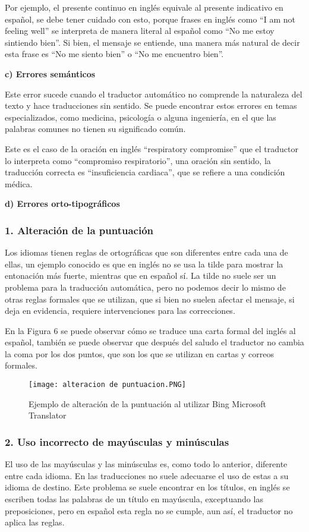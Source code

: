 \documentclass[conference]{IEEEtran}
\begin{document}
Por ejemplo, el presente continuo en inglés equivale al presente indicativo en español, se debe tener cuidado con esto, porque frases en inglés como “I am not feeling well” se interpreta de manera literal al español como “No me estoy sintiendo bien”. Si bien, el mensaje se entiende, una manera más natural de decir esta frase es “No me siento bien” o “No me encuentro bien”.

 \textbf{c) Errores semánticos}
 
 Este error sucede cuando el traductor automático no comprende la naturaleza del texto y hace traducciones sin sentido. Se puede encontrar estos errores en temas especializados, como medicina, psicología o alguna ingeniería, en el que las palabras comunes no tienen su significado común.
 
 Este es el caso de la oración en inglés “respiratory compromise” que el traductor lo interpreta como “compromiso respiratorio”, una oración sin sentido, la traducción correcta es “insuficiencia cardiaca”, que se refiere a una condición médica.
 
  \textbf{d) Errores orto-tipográficos}
  \subsubsection*{1. Alteración de la puntuación}

  Los idiomas tienen reglas de ortográficas que son diferentes entre cada una de ellas, un ejemplo conocido es que en inglés no se usa la tilde para mostrar la entonación más fuerte, mientras que en español sí. La tilde no suele ser un problema para la traducción automática, pero no podemos decir lo mismo de otras reglas formales que se utilizan, que si bien no suelen afectar el mensaje, si deja en evidencia, requiere intervenciones para las correcciones.
  
  En la Figura 6 se puede observar cómo se traduce una carta formal del inglés al español, también se puede observar que después del saludo el traductor no cambia la coma por los dos puntos, que son los que se utilizan en cartas y correos formales.

  \begin{figure}[htp]
        \centering
        \texttt{[image: alteracion de puntuacion.PNG]}
        \label{foto}
        \caption{Ejemplo de alteración de la puntuación al utilizar Bing Microsoft Translator}
    \end{figure}

\subsubsection*{2. Uso incorrecto de mayúsculas y minúsculas}
El uso de las mayúsculas y las minúsculas es, como todo lo anterior, diferente entre cada idioma. En las traducciones no suele adecuarse el uso de estas a su idioma de destino. Este problema se suele encontrar en los títulos, en inglés se escriben todas las palabras de un título en mayúscula, exceptuando las preposiciones, pero en español esta regla no se cumple, aun así, el traductor no aplica las reglas.
\end{document}
